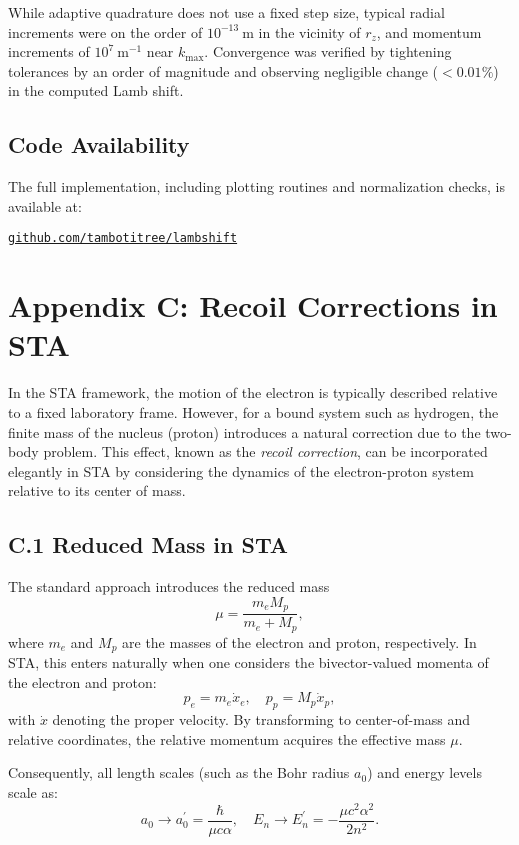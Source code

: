 \documentclass[12pt]{article}
\begin{document}
While adaptive quadrature does not use a fixed step size, typical radial increments were on the order of \(10^{-13}~\mathrm{m}\) in the vicinity of \(r_z\), and momentum increments of \(10^7~\mathrm{m}^{-1}\) near \(k_{\mathrm{max}}\). Convergence was verified by tightening tolerances by an order of magnitude and observing negligible change (\(<0.01\%\)) in the computed Lamb shift.

\subsection*{Code Availability}

The full implementation, including plotting routines and normalization checks, is available at:

\href{https://github.com/tambotitree/lambshift}{\texttt{github.com/tambotitree/lambshift}}

\appendix
\section*{Appendix C: Recoil Corrections in STA}

In the STA framework, the motion of the electron is typically described relative to a fixed laboratory frame. However, for a bound system such as hydrogen, the finite mass of the nucleus (proton) introduces a natural correction due to the two-body problem. This effect, known as the \emph{recoil correction}, can be incorporated elegantly in STA by considering the dynamics of the electron-proton system relative to its center of mass.

\subsection*{C.1 Reduced Mass in STA}

The standard approach introduces the reduced mass
\[
\mu = \frac{m_e M_p}{m_e + M_p},
\]
where \(m_e\) and \(M_p\) are the masses of the electron and proton, respectively. In STA, this enters naturally when one considers the bivector-valued momenta of the electron and proton:
\[
p_e = m_e \dot{x}_e, \quad p_p = M_p \dot{x}_p,
\]
with \(\dot{x}\) denoting the proper velocity. By transforming to center-of-mass and relative coordinates, the relative momentum acquires the effective mass \(\mu\). 

Consequently, all length scales (such as the Bohr radius \(a_0\)) and energy levels scale as:
\[
a_0 \to a_0^\prime = \frac{\hbar}{\mu c \alpha}, \quad
E_n \to E_n^\prime = -\frac{\mu c^2 \alpha^2}{2n^2}.
\]
\end{document}
